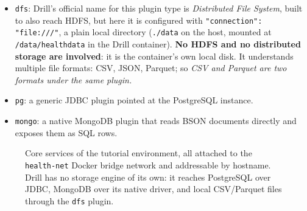\documentclass[11pt,a4paper]{article}
\begin{document}
\begin{itemize}[leftmargin=1.6em]
 \item \texttt{dfs}: Drill's official name for this plugin type is
    \emph{Distributed File System}, built to also reach HDFS, but
    here it is configured with \texttt{"connection": "file:///"}, a plain local
    directory (\texttt{./data} on the host, mounted at \texttt{/data/healthdata} in
    the Drill container). \textbf{No HDFS and no distributed storage are involved}:
    it is the container's own local disk. It understands multiple file formats: CSV, JSON, Parquet;  so \emph{CSV and Parquet are two formats under the same plugin.}
  \item \texttt{pg}: a generic JDBC plugin pointed at the PostgreSQL instance.
  \item \texttt{mongo}: a native MongoDB plugin that reads BSON documents directly
    and exposes them as SQL rows.
\end{itemize}

\begin{figure}[H]
\centering
{}
\caption{Core services of the tutorial environment, all attached to the
\texttt{health-net} Docker bridge network and addressable by hostname. Drill has no
storage engine of its own: it reaches PostgreSQL over JDBC, MongoDB over its native
driver, and local CSV/Parquet files through the \texttt{dfs} plugin. }
\label{fig:architecture}
\end{figure}
\end{document}
